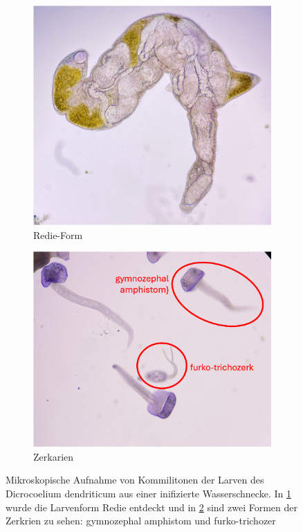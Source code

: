\documentclass[oneside,10pt,a4paper]{report}
\begin{document}
				\begin{figure}[H]
					\centering
					\begin{subfigure}[b]{0.4\textwidth}
						\includegraphics[width=\textwidth]{Redie.jpg}
						\caption{Redie-Form}
						\label{fig:Redie}
					\end{subfigure}
					\hfill
					\begin{subfigure}[b]{0.45\textwidth}
						\includegraphics[width=\textwidth]{Zerkarien.png}
						\caption{Zerkarien}
						\label{fig: Zerkarien}
					\end{subfigure}
					\caption{Mikroskopische Aufnahme von Kommilitonen der Larven des  Dicrocoelium dendriticum aus einer inifizierte Wasserschnecke. In \ref{fig:Redie} wurde die Larvenform Redie entdeckt und  in \ref{fig: Zerkarien} sind zwei Formen der Zerkrien zu sehen: gymnozephal amphistom und furko-trichozer}
					\label{fig: Trematodenlarven}
				\end{figure}
				
\end{document}
